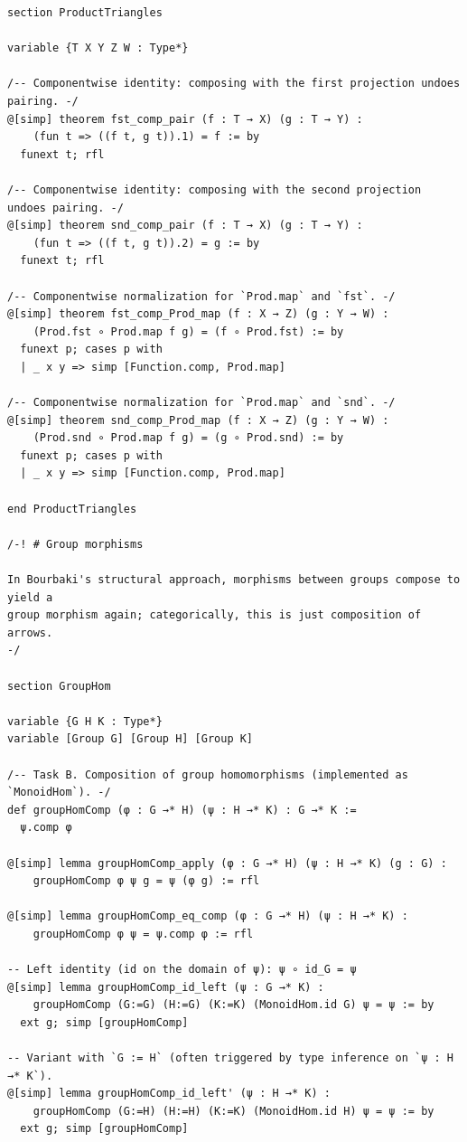 \documentclass[12pt]{article}
\begin{document}
\begin{lstlisting}
section ProductTriangles

variable {T X Y Z W : Type*}

/-- Componentwise identity: composing with the first projection undoes pairing. -/
@[simp] theorem fst_comp_pair (f : T → X) (g : T → Y) :
    (fun t => ((f t, g t)).1) = f := by
  funext t; rfl

/-- Componentwise identity: composing with the second projection undoes pairing. -/
@[simp] theorem snd_comp_pair (f : T → X) (g : T → Y) :
    (fun t => ((f t, g t)).2) = g := by
  funext t; rfl

/-- Componentwise normalization for `Prod.map` and `fst`. -/
@[simp] theorem fst_comp_Prod_map (f : X → Z) (g : Y → W) :
    (Prod.fst ∘ Prod.map f g) = (f ∘ Prod.fst) := by
  funext p; cases p with
  | _ x y => simp [Function.comp, Prod.map]

/-- Componentwise normalization for `Prod.map` and `snd`. -/
@[simp] theorem snd_comp_Prod_map (f : X → Z) (g : Y → W) :
    (Prod.snd ∘ Prod.map f g) = (g ∘ Prod.snd) := by
  funext p; cases p with
  | _ x y => simp [Function.comp, Prod.map]

end ProductTriangles

/-! # Group morphisms

In Bourbaki's structural approach, morphisms between groups compose to yield a
group morphism again; categorically, this is just composition of arrows.
-/

section GroupHom

variable {G H K : Type*}
variable [Group G] [Group H] [Group K]

/-- Task B. Composition of group homomorphisms (implemented as `MonoidHom`). -/
def groupHomComp (φ : G →* H) (ψ : H →* K) : G →* K :=
  ψ.comp φ

@[simp] lemma groupHomComp_apply (φ : G →* H) (ψ : H →* K) (g : G) :
    groupHomComp φ ψ g = ψ (φ g) := rfl

@[simp] lemma groupHomComp_eq_comp (φ : G →* H) (ψ : H →* K) :
    groupHomComp φ ψ = ψ.comp φ := rfl

-- Left identity (id on the domain of ψ): ψ ∘ id_G = ψ
@[simp] lemma groupHomComp_id_left (ψ : G →* K) :
    groupHomComp (G:=G) (H:=G) (K:=K) (MonoidHom.id G) ψ = ψ := by
  ext g; simp [groupHomComp]

-- Variant with `G := H` (often triggered by type inference on `ψ : H →* K`).
@[simp] lemma groupHomComp_id_left' (ψ : H →* K) :
    groupHomComp (G:=H) (H:=H) (K:=K) (MonoidHom.id H) ψ = ψ := by
  ext g; simp [groupHomComp]


\end{lstlisting}
\end{document}
